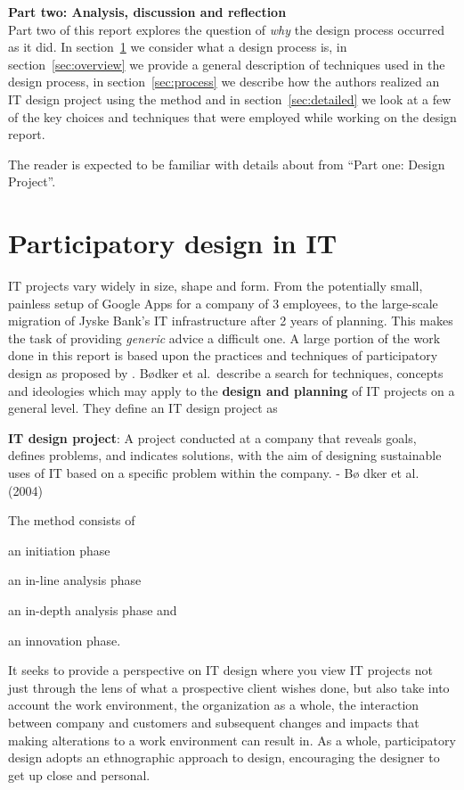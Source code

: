\setcounter{section}{0}
\setcounter{figure}{0}
\setcounter{table}{0}
\newpage
\textbf{\LARGE{{Part two: Analysis, discussion and reflection}}}\\

Part two of this report explores the question of \textit{why}
the design process occurred as it did. In section~\ref{sec:participatory}
we consider what a design process is, in section~\ref{sec:overview}
we provide a general description of techniques used in the design process,
in section~\ref{sec:process} we describe how the authors realized an IT design
project using the \must{} method and in section~\ref{sec:detailed} we
look at a few of the key choices and techniques that were employed while working
on the design report.

The reader is expected to be familiar with details about \gomonkey{} 
from ``Part one: Design Project''.

\section{Participatory design in IT} \label{sec:participatory}
IT projects vary widely in size, shape and form. From the potentially small,
painless setup of Google Apps for a company of 3 employees, to the large-scale
migration of Jyske Bank's IT infrastructure after 2 years of
planning\cite{jyskebank}. This makes the task of providing \textit{generic}
advice a difficult one. A large portion of the work done in this report is based
upon the practices and techniques of participatory design as proposed by
\cite{bodker2004participatory}.  B\o dker et al.\ describe a search for
techniques, concepts and ideologies which may apply to the \textbf{design and
planning} of IT projects on a general level. They define an IT design project as
\vspace{5mm}
\begin{framed}
    \textbf{IT design project}: A project conducted at a company that reveals
    goals, defines problems, and indicates solutions, with the aim of designing
    sustainable uses of IT based on a specific problem within the company. - B\o
    dker et al. (2004)
\end{framed}
\vspace{5mm}
The \must{}\cite{bodker2004participatory} method consists of
\begin{inparaenum}[1)]
    \item an initiation phase
    \item an in-line analysis phase
    \item an in-depth analysis phase and
    \item an innovation phase.
\end{inparaenum}
It seeks to provide a perspective on IT design where you view IT projects not
just through the lens of what a prospective client wishes done, but also take into
account the work environment, the organization as a whole, the interaction
between company and customers and subsequent changes and impacts that making
alterations to a work environment can result in. As a whole, participatory
design adopts an ethnographic approach to design, encouraging the designer to
get up close and personal.

